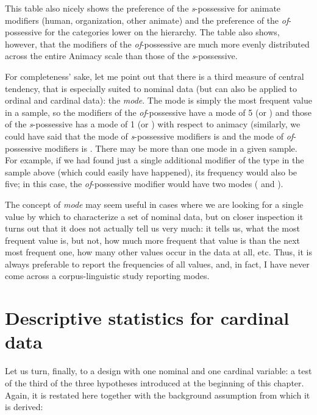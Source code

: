 This table also nicely shows the preference of the \textit{s}-possessive for animate modifiers (human, organization, other animate) and the preference of the \textit{of}-possessive for the categories lower on the hierarchy. The table also shows, however, that the modifiers of the \textit{of}-possessive are much more evenly distributed across the entire Animacy scale than those of the \textit{s}-possessive.

For completeness' sake, let me point out that there is a third measure of central tendency, that is especially suited to nominal data (but can also be applied to ordinal and cardinal data): the \textit{mode}. The mode is simply the most frequent value in a sample, so the modifiers of the \textit{of}-possessive have a mode of 5 (or ) and those of the \textit{s}-possessive has a mode of 1 (or ) with respect to animacy (similarly, we could have said that the mode of \textit{s}-possessive modifiers is  and the mode of \textit{of}-possessive modifiers is . There may be more than one mode in a given sample. For example, if we had found just a single additional modifier of the type  in the sample above (which could easily have happened), its frequency would also be five; in this case, the \textit{of}-possessive modifier would have two modes ( and ). 

The concept of \textit{mode} may seem useful in cases where we are looking for a single value by which to characterize a set of nominal data, but on closer inspection it turns out that it does not actually tell us very much: it tells us, what the most frequent value is, but not, how much more frequent that value is than the next most frequent one, how many other values occur in the data at all, etc. Thus, it is always preferable to report the frequencies of all values, and, in fact, I have never come across a corpus-linguistic study reporting modes.

\section{Descriptive statistics for cardinal data}
\label{sec:descriptivecardinal}

Let us turn, finally, to a design with one nominal and one cardinal variable: a test of the third of the three hypotheses introduced at the beginning of this chapter. Again, it is restated here together with the background assumption from which it is derived:

